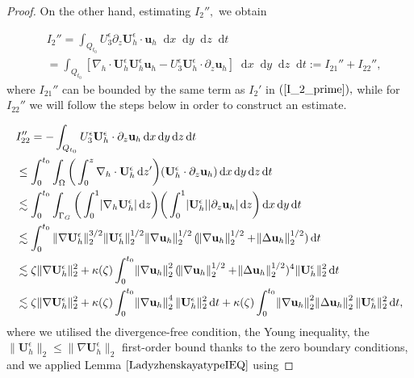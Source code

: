 \documentclass[11pt]{article}
\newcommand*\diff{\mathop{}\!\mathrm{d}}
\begin{document}
\begin{proof}
On the other hand, estimating $I_2'',$ we obtain

\begin{equation}
\begin{split}
& I_2 '' = \int_{Q_{t_0}} U^\epsilon_3 \partial_z \mathbf{U}_h^\epsilon \cdot \mathbf{u}_h \diff x \diff y \diff z \diff t \\
& = \int_{Q_{t_0}} [\nabla_h \cdot \mathbf{U}_h^\epsilon \mathbf{U}_h^\epsilon \mathbf{u}_h - U^\epsilon_3 \mathbf{U}_h^\epsilon \cdot \partial_z \mathbf{u}_h ] \diff x \diff y \diff z \diff t := I_{21}'' + I_{22}'',
\end{split}
\end{equation}
%
where $I_{21}''$ can be bounded by the same term as $I_2'$ in $(\ref{I_2_prime}),$ while for $I_{22}''$ we will follow the steps below in order to construct an estimate.

\begin{equation} \nonumber
\begin{split}
& I_{22}'' = - \int_{Q_{t_0}} U^\epsilon_3 \mathbf{U}_h^\epsilon \cdot \partial_z \mathbf{u}_h \diff x \diff y \diff z \diff t \\
& \leq \int_0^{t_0} \int_\Omega \bigg ( \int_0^z \nabla_h \cdot \mathbf{U}_h^\epsilon \diff z' \bigg ) (\mathbf{U}_h^\epsilon \cdot \partial_z \mathbf{u}_h) \diff x \diff y \diff z \diff t \\
& \lesssim \int_0^{t_0} \int_{\Gamma_G} \bigg ( \int_0^1 \abs{\nabla_h \mathbf{U}_h^\epsilon} \diff z \bigg) \bigg ( \int_0^1 \abs{\mathbf{U}_h^\epsilon} \abs{\partial_z \mathbf{u}_h} \diff z \bigg ) \diff x \diff y \diff t \\
& \lesssim \int_0^{t_0} \| \nabla \mathbf{U}_h^\epsilon \| _2^{3/2} \| \mathbf{U}_h^\epsilon \| _2^{1/2} \norm{\nabla \mathbf{u}_h}_2^{1/2} (\norm{\nabla \mathbf{u}_h}_2^{1/2} + \norm{\Delta \mathbf{u}_h}_2^{1/2}) \diff t \\
& \lesssim \zeta \| \nabla \mathbf{U}_h^\epsilon \| ^2_2 + \kappa(\zeta) \int_0^{t_0} \norm{\nabla \mathbf{u}_h}_2^2 (\norm{\nabla \mathbf{u}_h}_2^{1/2} + \norm{\Delta \mathbf{u}_h}_2^{1/2})^4 \| \mathbf{U}_h^\epsilon \|_2^2 \diff t \\
& \lesssim \zeta \| \nabla \mathbf{U}_h^\epsilon \| ^2_2 + \kappa(\zeta) \int_0^{t_0} \norm{\nabla \mathbf{u}_h}_2^4 \| \mathbf{U}_h^\epsilon \|_2^2 \diff t + \kappa(\zeta) \int_0^{t_0} \norm{\nabla \mathbf{u}_h}_2^2 \norm{\Delta \mathbf{u}_h}_2^2 \| \mathbf{U}_h^\epsilon \| _2^2 \diff t,
\end{split}
\end{equation}
%
where we utilised the divergence-free condition, the Young inequality, the $\| \mathbf{U}_h^\epsilon \|_2 \leq \| \nabla \mathbf{U}_h^\epsilon \|_2$ first-order bound thanks to the zero boundary conditions, and we applied Lemma $\ref{LadyzhenskayatypeIEQ}$ using


\end{proof}
\end{document}

